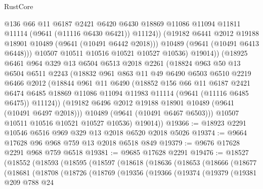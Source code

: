 \begin{lexlean}{RustCore}
\begin{coremodule}
                  @136
                  @66
                  @11
                  @6187
                  @2421
                  @6420
                  @6430
                  @18869
                  @11086
                  @11094
                  @11811
                  @11114
                  (@9641 (@11116 @6430 @6421))
                  @11124))
              (@19182 @6441 @2012 @19188 @18901 @10489 (@9641 (@10491 @6442 @2018)))
              @10489
              (@9641 (@10491 @6413 @6448)))
            @10507
            @10511
            @10516
            @10521
            @10527
            @10536)
          @19014))
      (@18925
        @6461
        @964
        @329
        @13
        @6504
        @6513
        @2018
        @2261
        (@18824
          @963
          @50
          @13
          @6504
          @6511
          @2243
          (@18832
            @961
            @863
            @11
            @49
            @6490
            @6503
            @6510
            @2219
            @6466
            @2012
            (@18844
              @961
              @11
              @6490
              (@18852
                @156
                @66
                @11
                @6187
                @2421
                @6474
                @6485
                @18869
                @11086
                @11094
                @11983
                @11114
                (@9641 (@11116 @6485 @6475))
                @11124))
            (@19182 @6496 @2012 @19188 @18901 @10489 (@9641 (@10491 @6497 @2018)))
            @10489
            (@9641 (@10491 @6467 @6503)))
          @10507
          @10511
          @10516
          @10521
          @10527
          @10536)
        @19014))
@19366 := @18923 @2291 @10546 @6516 @969 @329 @13 @2018 @6520 @2018 @5026
@19374 := @9664 @17628 @96 @968 @759 @13 @2018 @6518 @849
@19379 := @9676 @17628 @2291 @968 @759 @6518
@19381 := @9685 @17628 @2291
@19476 := @18527
    (@18552
      (@18593
        (@18595
          (@18597
            (@18618
              (@18636
                (@18653
                  (@18666
                    (@18677
                      (@18681
                        (@18708
                          (@18726
                            (@18769
                              (@19356
                                (@19366
                                  (@19374
                                    (@19379
                                      (@19381
                                        @209
                                        @788
                                        @24

\end{coremodule}
\end{lexlean}
